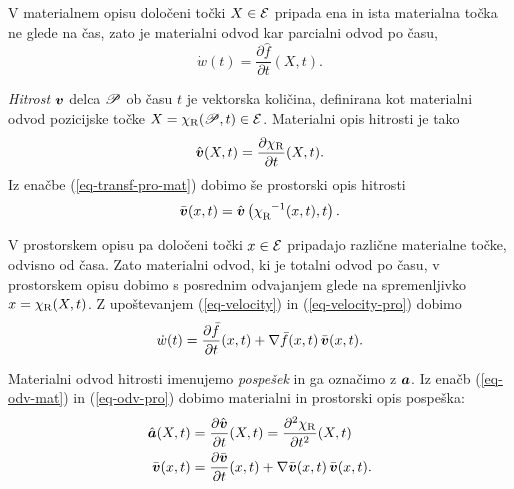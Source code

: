 V materialnem opisu določeni točki $X\in\E$ pripada ena in ista materialna točka ne glede na čas,
zato je materialni odvod kar parcialni odvod po času,
\begin{equation}\label{eq-odv-mat}
	\dot{w}(t)=\frac{\partial \hat{f}}{\partial t}(X,t).
\end{equation}
\begin{primer}
	\emph{Hitrost} $\vek{v}$ delca $\P$ ob času $t$ je vektorska količina,
	definirana kot materialni odvod pozicijske točke $X=\chi_{\r}(\P,t)\in\E$. Materialni
	opis hitrosti je tako
	\begin{equation}\label{eq-velocity}
		\hat{\vek{v}}(X,t)=\frac{\partial \chi_{\r}}{\partial t}(X,t).
	\end{equation}
	Iz enačbe (\ref{eq-transf-pro-mat}) dobimo še prostorski opis hitrosti
	\begin{equation}\label{eq-velocity-pro}
		\bar{\vek{v}}(x,t)=\hat{\vek{v}}\left(\chi_{\r}^{\phantom{\r}-1}(x,t),t\right).
	\end{equation}
\end{primer}
V prostorskem opisu pa določeni točki $x\in\E$ pripadajo različne materialne točke, odvisno od časa.
Zato materialni odvod, ki je totalni odvod po času, v prostorskem opisu dobimo s posrednim odvajanjem
glede na spremenljivko $x=\chi_{\r}(X,t)$. Z upoštevanjem (\ref{eq-velocity}) in (\ref{eq-velocity-pro}) dobimo
\begin{equation}\label{eq-odv-pro}
	\dot{w}(t)=\frac{\partial \bar{f}}{\partial t}(x,t)+\nabla\bar{f}(x,t)\,\bar{\vek{v}}(x,t).
\end{equation}
\begin{primer}
	Materialni odvod hitrosti imenujemo \emph{pospešek} in ga označimo z $\vek{a}$.
	Iz enačb (\ref{eq-odv-mat}) in (\ref{eq-odv-pro}) dobimo materialni in prostorski opis pospeška:
	\begin{align*}
		\hat{\vek{a}}(X,t)&=\frac{\partial \hat{\vek{v}}}{\partial t}(X,t)=
		\frac{\partial^2 \chi_{\r}}{\partial t^2}(X,t) \\
		\bar{\vek{v}}(x,t)&=\frac{\partial \bar{\vek{v}}}{\partial t}(x,t)+\nabla\bar{\vek{v}}(x,t)\,\bar{\vek{v}}(x,t).
	\end{align*}
\end{primer}